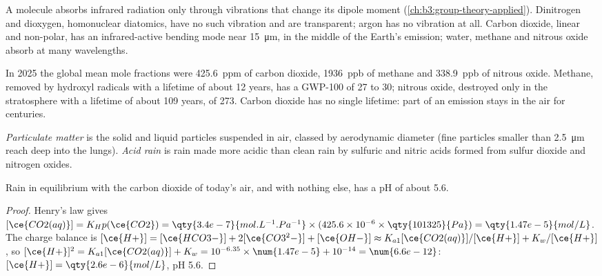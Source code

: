 A molecule absorbs infrared radiation only through vibrations that change its
dipole moment (\cref{ch:b3:group-theory-applied}). Dinitrogen and dioxygen,
homonuclear diatomics, have no such vibration and are transparent; argon has no
vibration at all. Carbon dioxide, linear and non-polar, has an infrared-active
bending mode near \qty{15}{\micro\metre}, in the middle of the Earth's emission; water, methane
and nitrous oxide absorb at many wavelengths.

In 2025 the global mean mole fractions were \qty{425.6}{ppm} of carbon dioxide, \qty{1936}{ppb} of
methane and \qty{338.9}{ppb} of nitrous oxide. Methane, removed by hydroxyl radicals with a
lifetime of about 12 years, has a GWP-100 of 27 to 30; nitrous oxide, destroyed only in
the stratosphere with a lifetime of about 109 years, of 273. Carbon dioxide has no
single lifetime: part of an emission stays in the air for centuries.

\begin{definition}\label{def:b3:environmental-toxicology:pollutants}
\emph{Particulate matter} is the solid and liquid
particles suspended in air, classed by aerodynamic diameter (fine particles
smaller than \qty{2.5}{\micro\metre} reach deep into the lungs). \emph{Acid
rain} is rain made more acidic than clean rain by sulfuric and
nitric acids formed from sulfur dioxide and nitrogen oxides.
\end{definition}

\begin{proposition}\label{prop:b3:environmental-toxicology:rain-ph}
Rain in equilibrium with the carbon dioxide of today's air, and with nothing
else, has a pH of about 5.6.
\end{proposition}

\begin{proof}
Henry's law gives $[\ce{CO2(aq)}] = K_Hp(\ce{CO2}) = \qty{3.4e-7}{mol.L^{-1}.Pa^{-1}} \times (425.6 \times 10^{-6} \times \qty{101325}{Pa}) = \qty{1.47e-5}{mol/L}$. The
charge balance is $[\ce{H+}] = [\ce{HCO3-}] + 2[\ce{CO3^2-}] + [\ce{OH-}] \approx K_{a1}[\ce{CO2(aq)}]/[\ce{H+}] + K_w/[\ce{H+}]$, so
$[\ce{H+}]^2 = K_{a1}[\ce{CO2(aq)}] + K_w = 10^{-6.35} \times \num{1.47e-5} + 10^{-14} = \num{6.6e-12}$: $[\ce{H+}] = \qty{2.6e-6}{mol/L}$, pH 5.6.
\end{proof}

